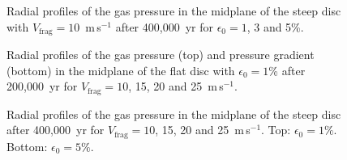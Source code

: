 \documentclass[a4paper,fleqn,usenatbib]{mnras}
\newcommand{\Vfrag}{V_\mathrm{frag}}  %
\begin{document}
\begin{figure}
\centering
{}
\caption{Radial profiles of the gas pressure in the midplane of the steep disc with $\Vfrag=10$~m\,s$^{-1}$ after 400,000~yr for $\epsilon_0=1$, 3 and 5\%.}
\label{Fig:Pmid_steep_e1_3_5_V10}
\end{figure}

\begin{figure}
\centering
{}
\caption{Radial profiles of the gas pressure (top) and pressure gradient (bottom) in the midplane of the flat disc with $\epsilon_0=1$\% after 200,000~yr for $\Vfrag=10$, 15, 20 and 25~m\,s$^{-1}$.}
\label{Fig:Pmid_flat_V15_20_25}
\end{figure}

\begin{figure}
\centering
{}
\caption{Radial profiles of the gas pressure in the midplane of the steep disc after 400,000~yr for $\Vfrag=10$, 15, 20 and 25~m\,s$^{-1}$. Top: $\epsilon_0=1\%$. Bottom: $\epsilon_0=5\%$.}
\label{Fig:Pmid_steep_e1_5_V10_15_20_25}
\end{figure}
\end{document}
